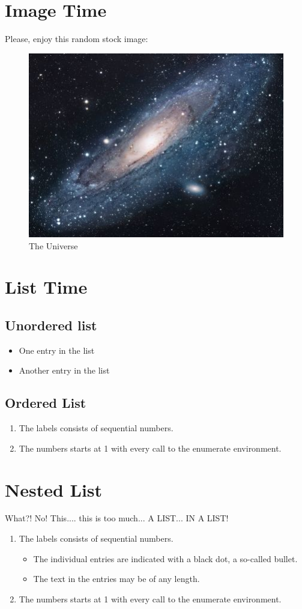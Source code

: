 \documentclass{article}
\begin{document}
\section{Image Time}
Please, enjoy this random stock image:
\begin{figure}[h!]
\centering
\includegraphics[scale=1.7]{universe}
\caption{The Universe}
\label{fig:universe}
\end{figure}

\section{List Time}
\subsection{Unordered list}
\begin{itemize}
  \item One entry in the list
  \item Another entry in the list
\end{itemize}

\subsection{Ordered List}
\begin{enumerate}
  \item The labels consists of sequential numbers.
  \item The numbers starts at 1 with every call to the enumerate environment.
\end{enumerate}

\section{Nested List}
What?! No! This.... this is too much... A LIST... IN A LIST!
\begin{enumerate}
   \item The labels consists of sequential numbers.
   \begin{itemize}
     \item The individual entries are indicated with a black dot, a so-called bullet.
     \item The text in the entries may be of any length.
   \end{itemize}
   \item The numbers starts at 1 with every call to the enumerate environment.
\end{enumerate}
\end{document}
